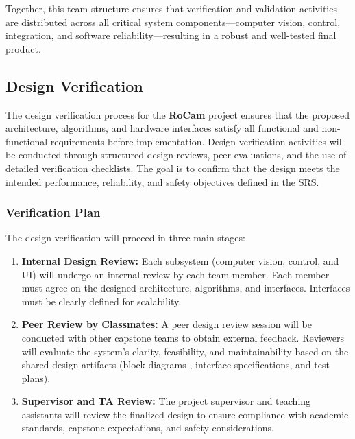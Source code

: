 \documentclass[12pt, titlepage]{article}
\begin{document}
Together, this team structure ensures that verification and validation
activities are distributed across all critical system components—computer
vision, control, integration, and software reliability—resulting in a robust
and well-tested final product.




\subsection{Design Verification}

The design verification process for the \textbf{RoCam} project ensures that the
proposed architecture, algorithms, and hardware interfaces satisfy all
functional and non-functional requirements before implementation. Design
verification activities will be conducted through structured design reviews,
peer evaluations, and the use of detailed verification checklists. The goal is
to confirm that the design meets the intended performance, reliability, and
safety objectives defined in the SRS.

\subsubsection*{Verification Plan}
The design verification will proceed in three main stages:
\begin{enumerate}
  \item \textbf{Internal Design Review:}
        Each subsystem (computer vision, control, and UI)
        will undergo an internal review by each team member. Each member must
        agree on the designed architecture, algorithms, and interfaces.
        Interfaces must be clearly defined for scalability.

  \item \textbf{Peer Review by Classmates:}
        A peer design review session will be conducted with other capstone
        teams to obtain external feedback.
        Reviewers will evaluate the system’s clarity, feasibility, and
        maintainability based on the shared design artifacts (block diagrams
        , interface specifications, and test plans).

  \item \textbf{Supervisor and TA Review:}
        The project supervisor and teaching assistants will review the
        finalized design to ensure compliance with academic standards,
        capstone expectations, and safety considerations.
\end{enumerate}
\end{document}
